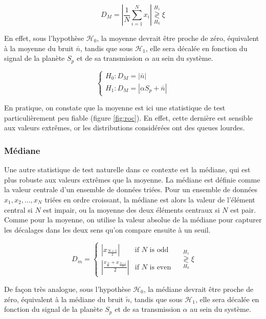 \documentclass{article}
\begin{document}
$$
D_{M} = \left|\frac{1}{N}\sum_{i=1}^N x_i \right| \stackrel{H_1}{\underset{H_0}{\gtrless}} \xi
$$

En effet, sous l'hypothèse $\mathcal{H}_0$, la moyenne devrait être proche de zéro, équivalent à la moyenne du bruit $\bar{n}$, tandis que sous $\mathcal{H}_1$, elle sera décalée en fonction du signal de la planète $S_p$ et de sa transmission $\alpha$ au sein du système.

$$
\begin{cases}
H_0 : D_M = |\bar{n}|\\
H_1 : D_M =  |\alpha S_p + \bar{n}|
\end{cases}
$$

En pratique, on constate que la moyenne est ici une statistique de test particulièrement peu fiable (figure \ref{fig:roc}). En effet, cette dernière est sensible aux valeurs extrêmes, or les distributions considérées ont des queues lourdes.

\subsubsection{Médiane}
Une autre statistique de test naturelle dans ce contexte est la médiane, qui est plus robuste aux valeurs extrêmes que la moyenne. La médiane est définie comme la valeur centrale d'un ensemble de données triées. Pour un ensemble de données $x_1, x_2, \ldots, x_N$ triées en ordre croissant, la médiane est alors la valeur de l'élément central si $N$ est impair, ou la moyenne des deux éléments centraux si $N$ est pair. Comme pour la moyenne, on utilise la valeur absolue de la médiane pour capturer les décalages dans les deux sens qu'on compare ensuite à un seuil.

$$
D_m = 
\begin{cases}
\left| x_{\frac{N+1}{2}} \right| & \text{if }N\text{ is odd} \\

\left| \frac{x_{\frac{N}{2}} + x_{\frac{N+1}{2}}}{2} \right|  & \text{if }N\text{ is even}
\end{cases}
\quad\stackrel{H_1}{\underset{H_0}{\gtrless}} \xi
$$

De façon très analogue, sous l'hypothèse $\mathcal{H}_0$, la médiane devrait être proche de zéro, équivalent à la médiane du bruit $\tilde{n}$, tandis que sous $\mathcal{H}_1$, elle sera décalée en fonction du signal de la planète $S_p$ et de sa transmission $\alpha$ au sein du système.
\end{document}
